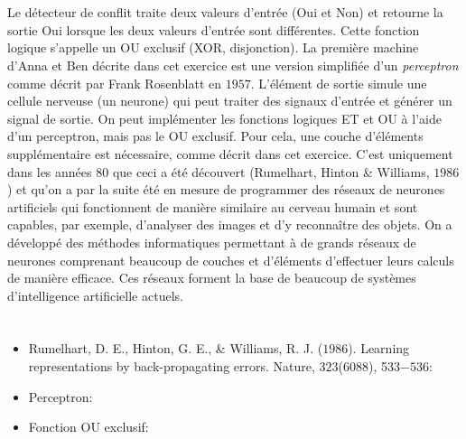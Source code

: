 {{\section*{\BrochureItsInformatics}
Le détecteur de conflit traite deux valeurs d’entrée (Oui et Non) et retourne la sortie Oui lorsque les deux valeurs d’entrée sont différentes. Cette fonction logique s’appelle un OU exclusif (XOR, disjonction). La première machine d’Anna et Ben décrite dans cet exercice est une version simplifiée d’un \emph{perceptron} comme décrit par Frank Rosenblatt en $1957$. L’élément de sortie simule une cellule nerveuse (un neurone) qui peut traiter des signaux d’entrée et générer un signal de sortie. On peut implémenter les fonctions logiques ET et OU à l’aide d’un perceptron, mais pas le OU exclusif. Pour cela, une couche d’éléments supplémentaire est nécessaire, comme décrit dans cet exercice. C’est uniquement dans les années $80$ que ceci a été découvert (Rumelhart, Hinton \& Williams, $1986$) et qu’on a par la suite été en mesure de programmer des réseaux de neurones artificiels qui fonctionnent de manière similaire au cerveau humain et sont capables, par exemple, d’analyser des images et d’y reconnaître des objets.
On a développé des méthodes informatiques permettant à de grands réseaux de neurones comprenant beaucoup de couches et d’éléments d’effectuer leurs calculs de manière efficace. Ces réseaux forment la base de beaucoup de systèmes d’intelligence artificielle actuels.



\section*{\BrochureWebsitesAndKeywords}
{\raggedright
\begin{itemize}
  \item Rumelhart, D. E., Hinton, G. E., \& Williams, R. J. ($1986$). Learning representations by back-propagating errors. Nature, $323$($6088$), 533$-536$: \href{http://www.cs.toronto.edu/~hinton/absps/naturebp.pdf}{}
  \item Perceptron: \href{https://fr.wikipedia.org/wiki/Perceptron}{}
  \item Fonction OU exclusif: \href{https://fr.wikipedia.org/wiki/Fonction_OU_exclusif}{}
\end{itemize}


}}}
